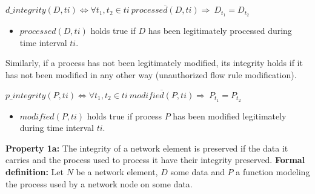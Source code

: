 \begin{myformula}
$d\_integrity(D,ti) \Leftrightarrow \forall t_1,t_2\in ti ~ \overline{processed(D, ti)} \Rightarrow 
~D_{t_1}=D_{t_2}$ 
\end{myformula}

\begin{itemize}
\item $processed(D, ti)$ holds true if $D$ has been legitimately processed during time interval $ti$.

\end{itemize}

Similarly, if a process has not been legitimately modified, its integrity holds if it has not been modified in any other way (\eg unauthorized flow rule modification). 

\begin{myformula}
$p\_integrity(P, ti) \Leftrightarrow \forall t_1,t_2 \in ti~ \overline{modified(P, ti)}\Rightarrow 
~P_{t_1}=P_{t_2}$
\end{myformula}

\begin{itemize}
\item $modified(P,ti)$ holds true if process $P$ has been modified legitimately during time interval $ti$.
\end{itemize}


\textbf{Property 1a:} The integrity of a network element is preserved if the data it carries and the process used to process it have their integrity preserved. 
\newline
\textbf{Formal definition:} Let $N$ be a network element, $D$ some data and $P$ a function modeling the process used by a network node on some data.

